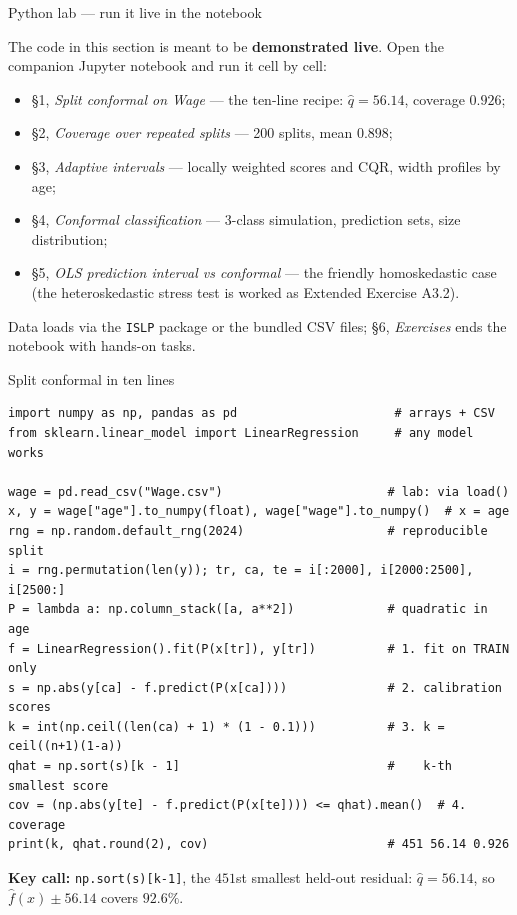 \documentclass[aspectratio=169,11pt]{beamer}
\begin{document}
\begin{frame}{Python lab --- run it live in the notebook}
  \begin{labnote}
    The code in this section is meant to be \textbf{demonstrated live}. Open the
    companion Jupyter notebook and run it cell by cell:
    \begin{itemize}
      \item \S1, \emph{Split conformal on Wage} --- the ten-line recipe:
            $\hat q = 56.14$, coverage $0.926$;
      \item \S2, \emph{Coverage over repeated splits} --- 200 splits, mean $0.898$;
      \item \S3, \emph{Adaptive intervals} --- locally weighted scores and CQR,
            width profiles by age;
      \item \S4, \emph{Conformal classification} --- 3-class simulation, prediction
            sets, size distribution;
      \item \S5, \emph{OLS prediction interval vs conformal} --- the friendly
            homoskedastic case (the heteroskedastic stress test is worked as
            Extended Exercise A3.2).
    \end{itemize}
    Data loads via the \texttt{ISLP} package or the bundled CSV files; \S6,
    \emph{Exercises} ends the notebook with hands-on tasks.
  \end{labnote}
\end{frame}

\begin{frame}[fragile]{Split conformal in ten lines}
  \begin{lstlisting}
import numpy as np, pandas as pd                      # arrays + CSV
from sklearn.linear_model import LinearRegression     # any model works

wage = pd.read_csv("Wage.csv")                       # lab: via load()
x, y = wage["age"].to_numpy(float), wage["wage"].to_numpy()  # x = age
rng = np.random.default_rng(2024)                    # reproducible split
i = rng.permutation(len(y)); tr, ca, te = i[:2000], i[2000:2500], i[2500:]
P = lambda a: np.column_stack([a, a**2])             # quadratic in age
f = LinearRegression().fit(P(x[tr]), y[tr])          # 1. fit on TRAIN only
s = np.abs(y[ca] - f.predict(P(x[ca])))              # 2. calibration scores
k = int(np.ceil((len(ca) + 1) * (1 - 0.1)))          # 3. k = ceil((n+1)(1-a))
qhat = np.sort(s)[k - 1]                             #    k-th smallest score
cov = (np.abs(y[te] - f.predict(P(x[te]))) <= qhat).mean()  # 4. coverage
print(k, qhat.round(2), cov)                         # 451 56.14 0.926
  \end{lstlisting}
  \vspace{-1mm}
  \begin{readme}
    \scriptsize
    \textbf{Key call:} \texttt{np.sort(s)[k-1]}, the $451$st smallest held-out
    residual: $\hat q = 56.14$, so $\hat f(x) \pm 56.14$ covers $92.6\%$.
  \end{readme}
\end{frame}
\end{document}
